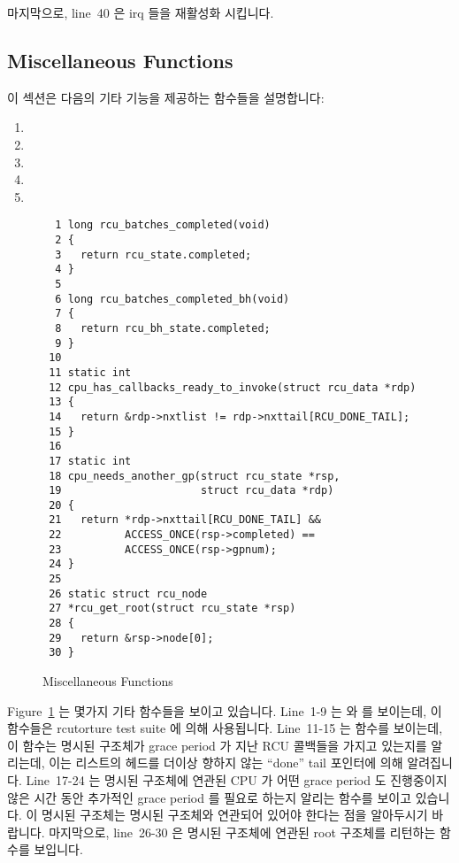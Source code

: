 마지막으로, line~40 은 irq 들을 재활성화 시킵니다.
\iffalse

Finally, line~40 re-enables irqs.
\fi

\subsection{Miscellaneous Functions}
\label{app:rcuimpl:rcutreewt:Miscellaneous Functions}

이 섹션은 다음의 기타 기능을 제공하는 함수들을 설명합니다:
\iffalse

This section describes the miscellaneous utility functions:
\fi
\begin{enumerate}
\item	{}
\item	{}
\item	{}
\item	{}
\item	{}
\end{enumerate}

\begin{figure}[tbp]
{ \scriptsize
\begin{verbatim}
  1 long rcu_batches_completed(void)
  2 {
  3   return rcu_state.completed;
  4 }
  5
  6 long rcu_batches_completed_bh(void)
  7 {
  8   return rcu_bh_state.completed;
  9 }
 10
 11 static int
 12 cpu_has_callbacks_ready_to_invoke(struct rcu_data *rdp)
 13 {
 14   return &rdp->nxtlist != rdp->nxttail[RCU_DONE_TAIL];
 15 }
 16
 17 static int
 18 cpu_needs_another_gp(struct rcu_state *rsp,
 19                      struct rcu_data *rdp)
 20 {
 21   return *rdp->nxttail[RCU_DONE_TAIL] &&
 22          ACCESS_ONCE(rsp->completed) ==
 23          ACCESS_ONCE(rsp->gpnum);
 24 }
 25
 26 static struct rcu_node
 27 *rcu_get_root(struct rcu_state *rsp)
 28 {
 29   return &rsp->node[0];
 30 }
\end{verbatim}
}
\caption{Miscellaneous Functions}
\label{fig:app:rcuimpl:rcutreewt:Miscellaneous Functions}
\end{figure}

Figure~\ref{fig:app:rcuimpl:rcutreewt:Miscellaneous Functions}
는 몇가지 기타 함수들을 보이고 있습니다.
Line~1-9 는  와  를
보이는데, 이 함수들은 rcutorture test suite 에 의해 사용됩니다.
Line~11-15 는  함수를 보이는데, 이
함수는 명시된  구조체가 grace period 가 지난 RCU 콜백들을 가지고
있는지를 알리는데, 이는 리스트의 헤드를 더이상 향하지 않는 ``done'' tail
포인터에 의해 알려집니다.
Line~17-24 는 명시된  구조체에 연관된 CPU 가 어떤 grace period 도
진행중이지 않은 시간 동안 추가적인 grace period 를 필요로 하는지 알리는
 함수를 보이고 있습니다.
이 명시된  구조체는 명시된  구조체와 연관되어 있어야
한다는 점을 알아두시기 바랍니다.
마지막으로, line~26-30 은 명시된  구조체에 연관된 root
 구조체를 리턴하는  함수를 보입니다.
\iffalse

